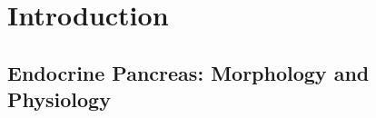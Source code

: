 


\chapter{Introduction}  %
\label{chapter1}

\newpage


\section{Endocrine Pancreas: Morphology and Physiology}  %

